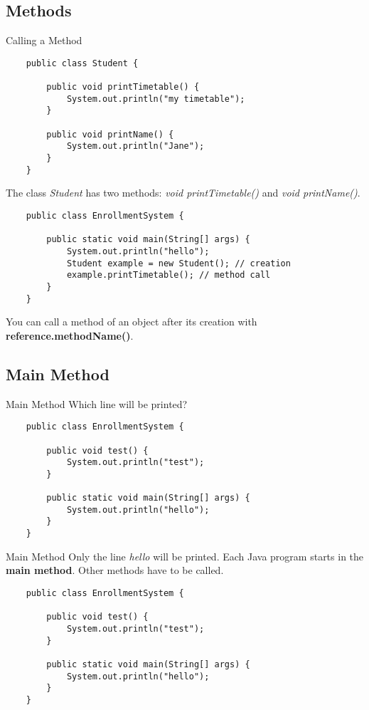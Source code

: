 \subsection{Methods}
\begin{frame}{Calling a Method}
	\begin{lstlisting}
	public class Student {
	
	    public void printTimetable() {
	        System.out.println("my timetable");
	    }
	    
	    public void printName() {
	        System.out.println("Jane");
	    }
	}
	\end{lstlisting}
	The class \emph{Student} has two methods: \emph{void printTimetable()} and \emph{void printName()}.
	\begin{lstlisting}
	public class EnrollmentSystem {
	    
	    public static void main(String[] args) {
	        System.out.println("hello");
	        Student example = new Student(); // creation
	        example.printTimetable(); // method call
	    }
	}
	\end{lstlisting}
	You can call a method of an object after its creation with \textbf{reference.methodName()}.
\end{frame}

\subsection{Main Method}
\begin{frame}[fragile]{Main Method}
	Which line will be printed?
	\begin{lstlisting}
	public class EnrollmentSystem {
	
	    public void test() {
	        System.out.println("test");
	    }
	    
	    public static void main(String[] args) {
	        System.out.println("hello");
	    }
	}
	\end{lstlisting}
\end{frame}

\begin{frame}[fragile]{Main Method}
	Only the line \emph{hello} will be printed. 
	Each Java program starts in the \textbf{main method}. 
	Other methods have to be called.
	\begin{lstlisting}
	public class EnrollmentSystem {
	
	    public void test() {
	        System.out.println("test");
	    }
	    
	    public static void main(String[] args) {
	        System.out.println("hello");
	    }
	}
	\end{lstlisting}
\end{frame}

